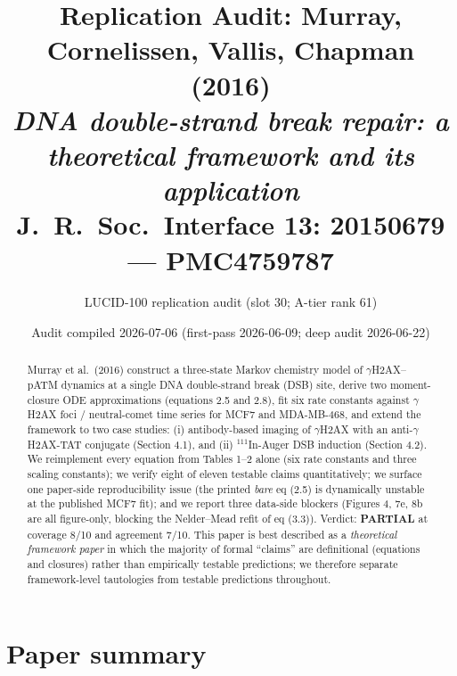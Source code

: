 \documentclass[11pt]{article}
\title{Replication Audit: Murray, Cornelissen, Vallis, Chapman (2016)\\
\emph{DNA double-strand break repair: a theoretical framework and its application}\\
\textnormal{\normalsize J.\ R.\ Soc.\ Interface \textbf{13}: 20150679 --- PMC4759787}}
\author{LUCID-100 replication audit (slot 30; A-tier rank 61)}
\date{Audit compiled 2026-07-06 (first-pass 2026-06-09; deep audit 2026-06-22)}
\begin{document}
\maketitle

\begin{abstract}
Murray et al.\ (2016) construct a three-state Markov chemistry model of $\gamma$H2AX--pATM
dynamics at a single DNA double-strand break (DSB) site, derive two moment-closure ODE
approximations (equations 2.5 and 2.8), fit six rate constants against $\gamma$H2AX foci /
neutral-comet time series for MCF7 and MDA-MB-468, and extend the framework to two
case studies: (i) antibody-based imaging of $\gamma$H2AX with an anti-$\gamma$H2AX-TAT
conjugate (Section 4.1), and (ii) $^{111}$In-Auger DSB induction (Section 4.2).
We reimplement every equation from Tables 1--2 alone (six rate constants and three
scaling constants); we verify eight of eleven testable claims quantitatively; we surface one
paper-side reproducibility issue (the printed \emph{bare} eq (2.5) is dynamically unstable at
the published MCF7 fit); and we report three data-side blockers (Figures 4, 7e, 8b are all
figure-only, blocking the Nelder--Mead refit of eq (3.3)). Verdict: \textbf{PARTIAL} at
coverage 8/10 and agreement 7/10.
This paper is best described as a \emph{theoretical framework paper} in which the majority of
formal ``claims'' are definitional (equations and closures) rather than empirically testable
predictions; we therefore separate framework-level tautologies from testable predictions
throughout.
\end{abstract}

\section{Paper summary}
\end{document}
